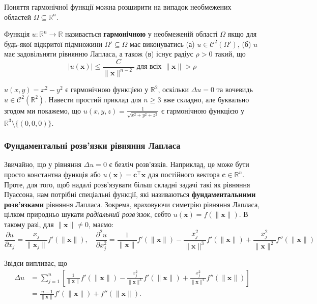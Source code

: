 \documentclass{exam_template}
\begin{document}
Поняття гармонічної функції можна розширити на випадок необмежених
областей $\Omega \subseteq \mathbb{R}^n$.
\begin{definition}
    Функція $u: \mathbb{R}^n \to \mathbb{R}$ називається \textbf{гармонічною} у
    необмеженій області $\Omega$ якщо для будь-якої відкритої підмножини
    $\Omega' \subseteq \Omega$ має виконуватись (а) $u \in
    \mathcal{C}^2(\Omega')$, (б) $u$ має задовільняти рівнянню Лапласа, а також
    (в) існує радіус $\rho > 0$ такий, що
    \begin{equation*}
        \left|u(\mathbf{x})\right| \leq \frac{C}{\|\mathbf{x}\|^{n-2}} \; \text{для всіх $\|\mathbf{x}\| > \rho$} 
    \end{equation*}
\end{definition}

\begin{example}
    $u(x,y) = x^2-y^2$ є гармонічною функцією у $\mathbb{R}^2$, оскільки
    $\Delta u = 0$ та вочевидь $u \in \mathcal{C}^2(\mathbb{R}^2)$. Навести 
    простий приклад для $n \geq 3$ вже складно, але буквально згодом 
    ми покажемо, що $u(x,y,z) = \frac{1}{\sqrt{x^2+y^2+z^2}}$ є 
    гармонічною функцією у $\mathbb{R}^3 \setminus \{(0,0,0)\}$.
\end{example}

\subsubsection{Фундаментальні розв'язки рівняння Лапласа}
Звичайно, що у рівняння $\Delta u = 0$ є безліч розв'язків. Наприклад, це може
бути просто константна функція або $u(\mathbf{x}) = \mathbf{c}^{\top}\mathbf{x}$
для постійного вектора $\mathbf{c} \in \mathbb{R}^n$. Проте, для того, щоб
надалі розв'язувати більш складні задачі такі як рівняння Пуассона, нам потрібні
спеціальні функції, які називаються \textbf{фундаментальними розв'язками}
рівняння Лапласа. Зокрема, враховуючи симетрію рівняння Лапласа, цілком
природньо шукати \textit{радіальний розв'язок}, себто $u(\mathbf{x}) =
f(\|\mathbf{x}\|)$. В такому разі, для $\|\mathbf{x}\| \neq 0$, маємо:
\begin{equation*}
    \frac{\partial u}{\partial x_j} = \frac{x_j}{\|\mathbf{x}_j\|}f'(\|\mathbf{x}\|), \quad \frac{\partial^2 u}{\partial x_j^2} = \frac{1}{\|\mathbf{x}\|}f'(\|\mathbf{x}\|) - \frac{x_j^2}{\|\mathbf{x}\|^3}f'(\|\mathbf{x}\|) + \frac{x_j^2}{\|\mathbf{x}\|^2}f''(\|\mathbf{x}\|)
\end{equation*}

Звідси випливає, що
\begin{align*}
    \Delta u &= \sum_{j=1}^n \left[\frac{1}{\|\mathbf{x}\|}f'(\|\mathbf{x}\|) - \frac{x_j^2}{\|\mathbf{x}\|^3}f'(\|\mathbf{x}\|) + \frac{x_j^2}{\|\mathbf{x}\|^2}f''(\|\mathbf{x}\|)\right] \\
    &= \frac{n-1}{\|\mathbf{x}\|}f'(\|\mathbf{x}\|) + f''(\|\mathbf{x}\|).
\end{align*}
\end{document}
